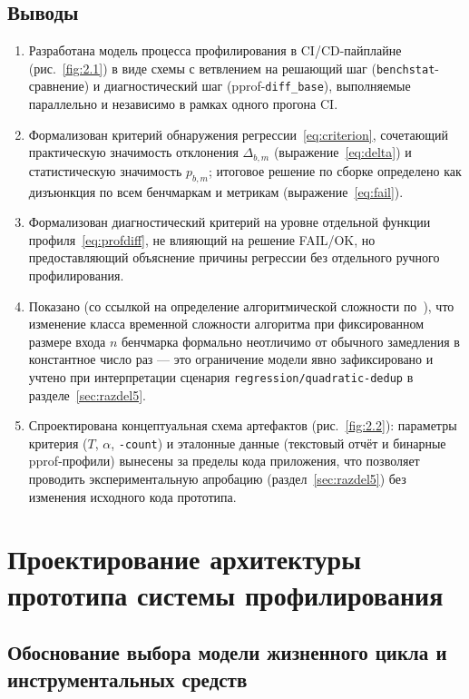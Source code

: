 \documentclass[12pt,a4paper]{article}
\newcommand{\newrazdel}{\clearpage}
\numberwithin{equation}{section}
\begin{document}
\subsection{Выводы}

\begin{enumerate}
\item Разработана модель процесса профилирования в CI/CD-пайплайне
(рис.~\ref{fig:2.1}) в виде схемы с ветвлением на решающий шаг
(\texttt{benchstat}-сравнение) и диагностический шаг (pprof-\texttt{diff\_base}),
выполняемые параллельно и независимо в рамках одного прогона CI.
\item Формализован критерий обнаружения регрессии~\eqref{eq:criterion},
сочетающий практическую значимость отклонения $\Delta_{b,m}$
(выражение~\eqref{eq:delta}) и статистическую значимость $p_{b,m}$; итоговое
решение по сборке определено как дизъюнкция по всем бенчмаркам и метрикам
(выражение~\eqref{eq:fail}).
\item Формализован диагностический критерий на уровне отдельной функции
профиля~\eqref{eq:profdiff}, не влияющий на решение FAIL/OK, но
предоставляющий объяснение причины регрессии без отдельного ручного
профилирования.
\item Показано (со ссылкой на определение алгоритмической сложности
по~\cite{clrs}), что изменение класса временной сложности алгоритма при
фиксированном размере входа $n$ бенчмарка формально неотличимо от обычного
замедления в константное число раз — это ограничение модели явно
зафиксировано и учтено при интерпретации сценария
\texttt{regression/\allowbreak quadratic-dedup} в разделе~\ref{sec:razdel5}.
\item Спроектирована концептуальная схема артефактов (рис.~\ref{fig:2.2}):
параметры критерия ($T$, $\alpha$, \texttt{-count}) и эталонные данные
(текстовый отчёт и бинарные pprof-профили) вынесены за пределы кода
приложения, что позволяет проводить экспериментальную апробацию
(раздел~\ref{sec:razdel5}) без изменения исходного кода прототипа.
\end{enumerate}

\newrazdel
\section{Проектирование архитектуры прототипа системы профилирования}
\label{sec:razdel3}

\subsection{Обоснование выбора модели жизненного цикла и инструментальных средств}
\label{sec:3.1}
\end{document}
